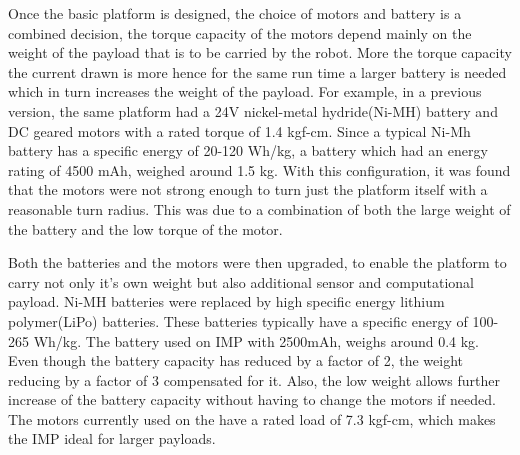 Once the basic platform is designed, the choice of motors and battery is a combined decision, the torque capacity of the motors depend mainly on the weight of the payload that is to be carried by the robot. More the torque capacity the current drawn is more hence for the same run time a larger battery is needed which in turn increases the weight of the payload. For example, in a previous version, the same platform had a 24V nickel-metal hydride(Ni-MH) battery and DC geared motors with a rated torque of 1.4 kgf-cm. Since a typical Ni-Mh battery has a specific energy of 20-120 Wh/kg, a battery which had an energy rating of 4500 mAh, weighed around 1.5 kg. With this configuration, it was found that the motors were not strong enough to turn just the platform itself with a reasonable turn radius. This was due to a combination of both the large weight of the battery and the low torque of the motor. 

Both the batteries and the motors were then upgraded, to enable the platform to carry not only it's own weight but also additional sensor and computational payload. Ni-MH batteries were replaced by high specific energy lithium polymer(LiPo) batteries. These batteries typically have a specific energy of 100-265 Wh/kg. The battery used on IMP with 2500mAh, weighs around 0.4 kg. Even though the battery capacity has reduced by a factor of 2, the weight reducing by a factor of 3 compensated for it. Also, the low weight allows further increase of the battery capacity without having to change the motors if needed. The motors currently used on the \imp have a rated load of 7.3 kgf-cm, which makes the IMP ideal for larger payloads.

%

